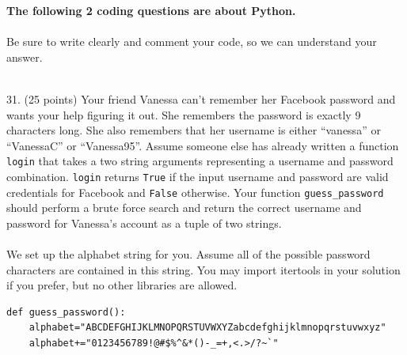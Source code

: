 \documentclass{article}
\newcounter{question}
\begin{document}

\pagebreak \noindent \textbf{The following 2 coding questions are about Python.}
\\\\
\noindent Be sure to write clearly and comment your code, so we can understand your answer.
\\\\


\noindent
\begin{minipage}{\textwidth}
31. (25 points)
Your friend Vanessa can't remember her Facebook password and wants your help figuring it out. She remembers the password is exactly 9 characters long. She also remembers that her username is either ``vanessa'' or ``VanessaC'' or ``Vanessa95''. Assume someone else has already written a function \verb|login| that takes a two string arguments representing a username and password combination. \verb|login| returns  \verb|True| if the input username and password are valid credentials for Facebook and \verb|False| otherwise. Your function  \verb|guess_password| should perform a brute force search and return the correct username and password for Vanessa's account as a tuple of two strings.
\\\\
\noindent We set up the alphabet string for you. Assume all of the possible password characters are contained in this string. You may import itertools in your solution if you prefer, but no other libraries are allowed.

\begin{verbatim}
def guess_password():
    alphabet="ABCDEFGHIJKLMNOPQRSTUVWXYZabcdefghijklmnopqrstuvwxyz"
    alphabet+="0123456789!@#$%^&*()-_=+,<.>/?~`"
\end{verbatim}

\end{minipage}
\vspace{10em}
\filbreak\vfil{}\vfilneg


\pagebreak \noindent
\end{document}
